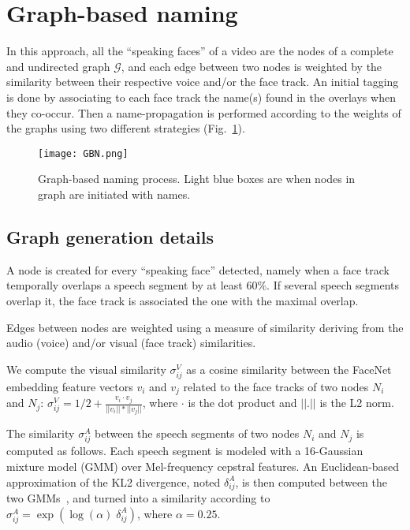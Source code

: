 \section{Graph-based naming}
\label{sec:graph}

In this approach, all the ``speaking faces'' of a video are the nodes of a complete and undirected graph $\mathcal{G}$, and each edge between two nodes is weighted by the similarity between their respective voice and/or the face track.
An initial tagging is done by associating to each face track the name(s) found in the overlays when they co-occur. Then a name-propagation is performed according to the weights of the graphs using two different strategies (Fig.~\ref{fig:gbn}).

\begin{figure}[!htb]
 \centering
 \texttt{[image: GBN.png]}
\vspace*{-5mm}
 \caption{Graph-based naming process. Light blue boxes are when nodes in graph are initiated with names.}
\vspace*{-5mm}
 \label{fig:gbn}
\end{figure}

\subsection{Graph generation details}
\label{ssec:graph_gen}
A node is created for every ``speaking face'' detected, namely when a face track temporally overlaps a speech segment by at least 60\%. If several speech segments overlap it, the face track is associated the one with the maximal overlap.

Edges between nodes are weighted using a measure of similarity deriving from the audio (voice) and/or visual (face track) similarities.

We compute the visual similarity $\sigma^V_{ij}$ as a cosine similarity between the FaceNet embedding feature vectors $v_i$ and $v_j$ related to the face tracks of two nodes $N_i$ and $N_j$: $\sigma^V_{ij}=1/2+\frac{v_i\cdot v_j}{||v_i||*||v_j||}$, where $\cdot$ is the dot product and $||.||$ is the L2 norm.

The similarity $\sigma^A_{ij}$ between the speech segments of two nodes  $N_i$ and $N_j$ is computed as follows. Each speech segment is modeled with a 16-Gaussian mixture model (GMM) over Mel-frequency cepstral features. An Euclidean-based approximation of the KL2 divergence, noted $\delta^A_{ij}$, is then computed between the two GMMs~\cite{Ben}, and turned into a similarity according to $\sigma^A_{ij}=\exp(\log{(\alpha)} \; \delta^A_{ij})$, where $\alpha = 0.25$.

